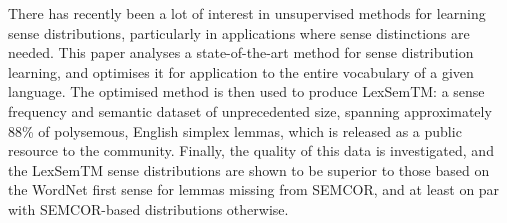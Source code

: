 There has recently been a lot of interest in unsupervised methods for learning sense distributions, particularly in applications where sense distinctions are needed. This paper analyses a state-of-the-art method for sense distribution learning, and optimises it for application to the entire vocabulary of a given language. The optimised method is then used to produce LexSemTM: a sense frequency and semantic dataset of unprecedented size, spanning approximately 88\% of polysemous, English simplex lemmas, which is released as a public resource to the community. Finally, the quality of this data is investigated, and the LexSemTM sense distributions are shown to be superior to those based on the WordNet first sense for lemmas missing from SEMCOR, and at least on par with SEMCOR-based distributions otherwise.
